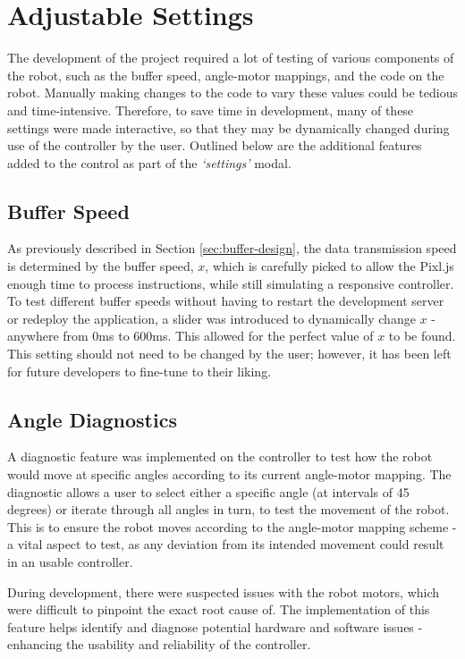 \documentclass{l4proj}
\begin{document}
\section{Adjustable Settings}
The development of the project required a lot of testing of various components of the robot, such as the buffer speed, angle-motor mappings, and the code on the robot. Manually making changes to the code to vary these values could be tedious and time-intensive. Therefore, to save time in development, many of these settings were made interactive, so that they may be dynamically changed during use of the controller by the user. Outlined below are the additional features added to the control as part of the \textit{‘settings’} modal.

\subsection{Buffer Speed}
As previously described in Section \ref{sec:buffer-design}, the data transmission speed is determined by the buffer speed, $x$, which is carefully picked to allow the Pixl.js enough time to process instructions, while still simulating a responsive controller. To test different buffer speeds without having to restart the development server or redeploy the application, a slider was introduced to dynamically change $x$ - anywhere from 0ms to 600ms. This allowed for the perfect value of $x$ to be found. This setting should not need to be changed by the user; however, it has been left for future developers to fine-tune to their liking.

\subsection{Angle Diagnostics}
A diagnostic feature was implemented on the controller to test how the robot would move at specific angles according to its current angle-motor mapping. The diagnostic allows a user to select either a specific angle (at intervals of 45 degrees) or iterate through all angles in turn, to test the movement of the robot. This is to ensure the robot moves according to the angle-motor mapping scheme - a vital aspect to test, as any deviation from its intended movement could result in an usable controller.

During development, there were suspected issues with the robot motors, which were difficult to pinpoint the exact root cause of. The implementation of this feature helps identify and diagnose potential hardware and software issues - enhancing the usability and reliability of the controller.
\end{document}
